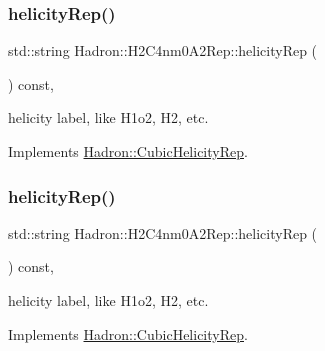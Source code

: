 \mbox{\label{structHadron_1_1H2C4nm0A2Rep_a8265918d931b1fc4c74311511fb81037}} 
\subsubsection{\texorpdfstring{helicityRep()}{helicityRep()}\hspace{0.1cm}{\footnotesize\ttfamily [1/2]}}
{\footnotesize\ttfamily std\+::string Hadron\+::\+H2\+C4nm0\+A2\+Rep\+::helicity\+Rep (\begin{DoxyParamCaption}{ }\end{DoxyParamCaption}) const\hspace{0.3cm}{\ttfamily [inline]}, {\ttfamily [virtual]}}

helicity label, like H1o2, H2, etc. 

Implements \mbox{\hyperlink{structHadron_1_1CubicHelicityRep_af1096946b7470edf0a55451cc662f231}{Hadron\+::\+Cubic\+Helicity\+Rep}}.

\mbox{\label{structHadron_1_1H2C4nm0A2Rep_a8265918d931b1fc4c74311511fb81037}} 
\subsubsection{\texorpdfstring{helicityRep()}{helicityRep()}\hspace{0.1cm}{\footnotesize\ttfamily [2/2]}}
{\footnotesize\ttfamily std\+::string Hadron\+::\+H2\+C4nm0\+A2\+Rep\+::helicity\+Rep (\begin{DoxyParamCaption}{ }\end{DoxyParamCaption}) const\hspace{0.3cm}{\ttfamily [inline]}, {\ttfamily [virtual]}}

helicity label, like H1o2, H2, etc. 

Implements \mbox{\hyperlink{structHadron_1_1CubicHelicityRep_af1096946b7470edf0a55451cc662f231}{Hadron\+::\+Cubic\+Helicity\+Rep}}.

\mbox{\label{structHadron_1_1H2C4nm0A2Rep_acf769194280e756693be59efab932c8d}} 
